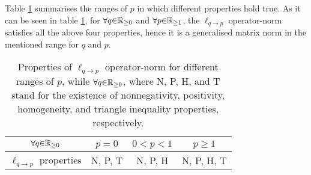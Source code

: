 Table \ref{table:OperatorNormProperties} summarises the ranges of $p$ in which different properties hold true.
As it can be seen in table \ref{table:OperatorNormProperties}, for $\forall q {\in} \mathbb{R}_{{\geq} 0}$ and $\forall p {\in} \mathbb{R}_{{\geq} 1}$, the $\ell_{q \to p}$ operator-norm satisfies all the above four properties, hence it is a generalised matrix norm in the mentioned range for $q$ and $p$.
\begin{table*}[bp]
\centering
\begin{tabular}{cccc}
\toprule
$\forall q {\in} \mathbb{R}_{{\geq} 0}$ & \multicolumn{1}{c}{$p=0$}  & \multicolumn{1}{c}{$0 < p < 1$} & \multicolumn{1}{c}{$p \geq 1$} \\ \midrule 
\multicolumn{1}{l}{$\ell_{q \to p}$ properties} & \multicolumn{1}{c}{N, P, T} & \multicolumn{1}{c}{N, P, H} & \multicolumn{1}{c}{N, P, H, T} \\ 
\bottomrule 
\end{tabular}
\caption{Properties of $\ell_{q \to p}$ operator-norm for different ranges of $p$, while $\forall q {\in} \mathbb{R}_{{\geq} 0}$, where N, P, H, and T stand for the existence of nonnegativity, positivity, homogeneity, and triangle inequality properties, respectively.}
\label{table:OperatorNormProperties}
\end{table*}